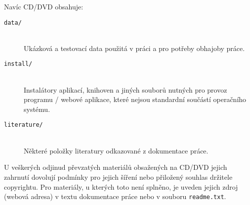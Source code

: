 \documentclass[12pt]{article}
\begin{document}
Navíc CD/DVD obsahuje:

\begin{description}

\item[\texttt{data/}] \hfill \\
Ukázková a testovací data použitá v práci a pro potřeby obhajoby
práce.

\item[\texttt{install/}] \hfill \\
Instalátory aplikací, knihoven a jiných souborů nutných pro provoz
programu / webové aplikace, které nejsou standardní součástí operačního
systému.

\item[\texttt{literature/}] \hfill \\
Některé položky literatury odkazované z dokumentace práce.

\end{description}

U veškerých odjinud převzatých materiálů obsažených na CD/DVD jejich
zahrnutí dovolují podmínky pro jejich šíření nebo přiložený souhlas
držitele copyrightu. Pro materiály, u kterých toto není splněno, je
uveden jejich zdroj (webová adresa) v textu dokumentace práce nebo v
souboru \texttt{readme.txt}.
\end{document}
